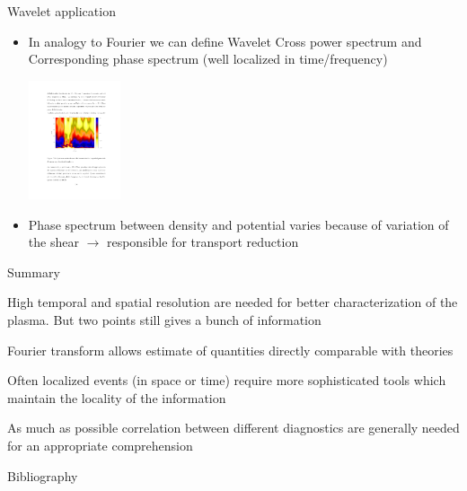 \documentclass[t,10pt]{beamer}
\begin{document}
\begin{frame}{Wavelet application}

\begin{itemize}
\item In analogy to Fourier we can define Wavelet Cross power spectrum
  and Corresponding phase spectrum (well localized in time/frequency)

\begin{center}
\includegraphics[height=3.5cm]{wavelet-phase}
\end{center}

\item Phase spectrum between density and potential varies because of
  variation of the shear $\rightarrow$ responsible for transport
  reduction {\footnotesize\parencite{Antoni:2000bn}}

\end{itemize}
\end{frame}




\begin{frame}{Summary}
\begin{itemize}
{\large\item High temporal and spatial resolution are needed for better
  characterization of the plasma. But two points still gives a bunch
  of information
\item Fourier transform allows estimate of quantities directly
  comparable with theories
\item Often localized events (in space or time) require more
  sophisticated tools which maintain the locality of the information
\item As much as possible correlation between different diagnostics
  are generally needed for an appropriate comprehension}
\end{itemize}

\end{frame}
\begin{frame}[allowframebreaks]{Bibliography}
\printbibliography
\end{frame}
\end{document}
